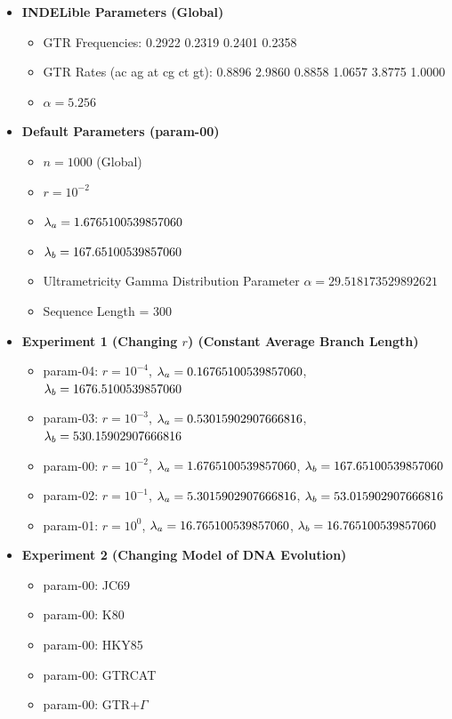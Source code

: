 \begin{itemize}
\item \textbf{INDELible Parameters (Global)}
\begin{itemize}
\item \gls{GTR} Frequencies: 0.2922 0.2319 0.2401 0.2358
\item \gls{GTR} Rates (ac ag at cg ct gt): 0.8896 2.9860 0.8858 1.0657 3.8775 1.0000
\item $\alpha = 5.256$
\end{itemize}

\item \textbf{Default Parameters (param-00)}
\begin{itemize}
\item $n = 1000$ (Global)
\item $r = 10^{-2}$
\item $\lambda_a = 1.6765100539857060$
\item $\lambda_b = 167.65100539857060$
\item Ultrametricity Gamma Distribution Parameter $\alpha = 29.518173529892621$
\item Sequence Length = 300
\end{itemize}

\item \textbf{Experiment 1 (Changing $r$) (Constant Average Branch Length)}
\begin{itemize}
\item param-04: $r = 10^{-4}$, $\lambda_a = 0.16765100539857060$, $\lambda_b = 1676.5100539857060$
\item param-03: $r = 10^{-3}$, $\lambda_a = 0.53015902907666816$, $\lambda_b = 530.15902907666816$
\item param-00: $r = 10^{-2}$, $\lambda_a = 1.6765100539857060$, $\lambda_b = 167.65100539857060$
\item param-02: $r = 10^{-1}$, $\lambda_a = 5.3015902907666816$, $\lambda_b = 53.015902907666816$
\item param-01: $r = 10^{0}$, $\lambda_a = 16.765100539857060$, $\lambda_b = 16.765100539857060$
\end{itemize}

\item \textbf{Experiment 2 (Changing Model of DNA Evolution)}
\begin{itemize}
\item param-00: JC69
\item param-00: K80
\item param-00: HKY85
\item param-00: GTRCAT
\item param-00: \gls{GTR}+$\Gamma$
\end{itemize}


\end{itemize}

